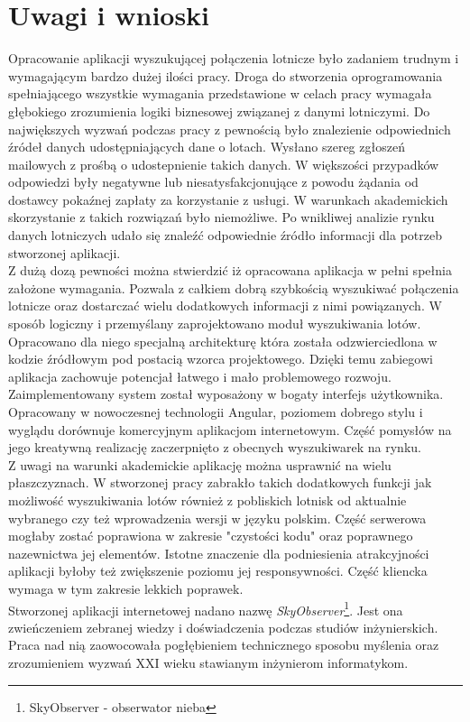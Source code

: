 \documentclass[12pt, twoside]{report}
\begin{document}
\chapter{Uwagi i wnioski}
Opracowanie aplikacji wyszukującej połączenia lotnicze było zadaniem trudnym i wymagającym bardzo dużej ilości pracy. Droga do stworzenia oprogramowania spełniającego wszystkie wymagania przedstawione w celach pracy wymagała głębokiego zrozumienia logiki biznesowej związanej z danymi lotniczymi. Do największych wyzwań podczas pracy z pewnością było znalezienie odpowiednich źródeł danych udostępniających dane o lotach. Wysłano szereg zgłoszeń mailowych z prośbą o udostepnienie takich danych. W większości przypadków odpowiedzi były negatywne lub niesatysfakcjonujące z powodu żądania od dostawcy pokaźnej zapłaty za korzystanie z usługi. W warunkach akademickich skorzystanie z takich rozwiązań było niemożliwe. Po wnikliwej analizie rynku danych lotniczych udało się znaleźć odpowiednie źródło informacji dla potrzeb stworzonej aplikacji. \\ \indent
 Z dużą dozą pewności można stwierdzić iż opracowana aplikacja w pełni spełnia założone wymagania. Pozwala z całkiem dobrą szybkością wyszukiwać połączenia lotnicze oraz dostarczać wielu dodatkowych informacji z nimi powiązanych. W sposób logiczny i przemyślany zaprojektowano moduł wyszukiwania lotów. Opracowano dla niego specjalną architekturę która została odzwierciedlona w kodzie źródłowym pod postacią wzorca projektowego. Dzięki temu zabiegowi aplikacja zachowuje potencjał łatwego i mało problemowego rozwoju. \\ \indent
Zaimplementowany system został wyposażony w bogaty interfejs użytkownika. Opracowany w nowoczesnej technologii Angular, poziomem dobrego stylu i wyglądu dorównuje komercyjnym aplikacjom internetowym. Część pomysłów na jego kreatywną realizację zaczerpnięto z obecnych wyszukiwarek na rynku. \\ \indent
Z uwagi na warunki akademickie aplikację można usprawnić na wielu płaszczyznach. W stworzonej pracy zabrakło takich dodatkowych funkcji jak możliwość wyszukiwania lotów również z pobliskich lotnisk od aktualnie wybranego czy też wprowadzenia wersji w języku polskim. Część serwerowa mogłaby zostać poprawiona w zakresie "czystości kodu" oraz poprawnego nazewnictwa jej elementów. Istotne znaczenie dla podniesienia atrakcyjności aplikacji byłoby też zwiększenie poziomu jej responsywności. Część kliencka wymaga w tym zakresie lekkich poprawek. \\ \indent
Stworzonej aplikacji internetowej nadano nazwę \textit{SkyObserver}\footnote{SkyObserver - obserwator nieba}. Jest ona zwieńczeniem zebranej wiedzy i doświadczenia podczas studiów inżynierskich. Praca nad nią zaowocowała pogłębieniem technicznego sposobu myślenia oraz zrozumieniem wyzwań XXI wieku stawianym inżynierom informatykom.
\end{document}
